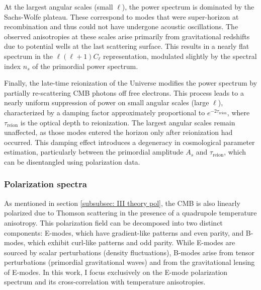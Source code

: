 \documentclass{aa}
\numberwithin{equation}{section}
\numberwithin{table}{section}
\numberwithin{figure}{section}
\begin{document}
At the largest angular scales (small $\ell$), the power spectrum is dominated by the Sachs-Wolfe plateau. These correspond to modes that were super-horizon at recombination and thus could not have undergone acoustic oscillations. The observed anisotropies at these scales arise primarily from gravitational redshifts due to potential wells at the last scattering surface. This results in a nearly flat spectrum in the $\ell(\ell+1)C_\ell$ representation, modulated slightly by the spectral index $n_s$ of the primordial power spectrum.

Finally, the late-time reionization of the Universe modifies the power spectrum by partially re-scattering CMB photons off free electrons. This process leads to a nearly uniform suppression of power on small angular scales (large $\ell$), characterized by a damping factor approximately proportional to $e^{-2\tau_{\text{reion}}}$, where $\tau_{\text{reion}}$ is the optical depth to reionization. The largest angular scales remain unaffected, as those modes entered the horizon only after reionization had occurred. This damping effect introduces a degeneracy in cosmological parameter estimation, particularly between the primordial amplitude $A_s$ and $\tau_{\text{reion}}$, which can be disentangled using polarization data.




\subsubsection{Polarization spectra}\label{subsubsec: IV theory polarization}
As mentioned in section \ref{subsubsec: III theory pol}, the CMB is also linearly polarized due to Thomson scattering in the presence of a quadrupole temperature anisotropy. This polarization field can be decomposed into two distinct components: E-modes, which have gradient-like patterns and even parity, and B-modes, which exhibit curl-like patterns and odd parity. While E-modes are sourced by scalar perturbations (density fluctuations), B-modes arise from tensor perturbations (primordial gravitational waves) and from the gravitational lensing of E-modes. In this work, I focus exclusively on the E-mode polarization spectrum and its cross-correlation with temperature anisotropies.
\end{document}
